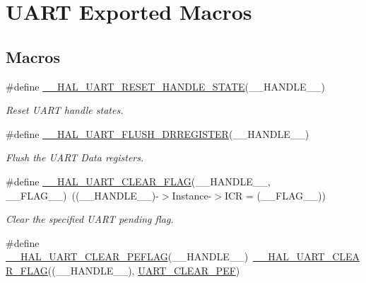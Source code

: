 \hypertarget{group___u_a_r_t___exported___macros}{}\section{U\+A\+RT Exported Macros}
\label{group___u_a_r_t___exported___macros}
\subsection*{Macros}
\begin{DoxyCompactItemize}
\item 
\#define \mbox{\hyperlink{group___u_a_r_t___exported___macros_ga19deab848407b106998416c78092fa9b}{\+\_\+\+\_\+\+H\+A\+L\+\_\+\+U\+A\+R\+T\+\_\+\+R\+E\+S\+E\+T\+\_\+\+H\+A\+N\+D\+L\+E\+\_\+\+S\+T\+A\+TE}}(\+\_\+\+\_\+\+H\+A\+N\+D\+L\+E\+\_\+\+\_\+)
\begin{DoxyCompactList}\small\item\em Reset U\+A\+RT handle states. \end{DoxyCompactList}\item 
\#define \mbox{\hyperlink{group___u_a_r_t___exported___macros_gafc4f20cb0f29ba146c9bc14167c52744}{\+\_\+\+\_\+\+H\+A\+L\+\_\+\+U\+A\+R\+T\+\_\+\+F\+L\+U\+S\+H\+\_\+\+D\+R\+R\+E\+G\+I\+S\+T\+ER}}(\+\_\+\+\_\+\+H\+A\+N\+D\+L\+E\+\_\+\+\_\+)
\begin{DoxyCompactList}\small\item\em Flush the U\+A\+RT Data registers. \end{DoxyCompactList}\item 
\#define \mbox{\hyperlink{group___u_a_r_t___exported___macros_ga9bd035161d41cde4f2568c7af06493bf}{\+\_\+\+\_\+\+H\+A\+L\+\_\+\+U\+A\+R\+T\+\_\+\+C\+L\+E\+A\+R\+\_\+\+F\+L\+AG}}(\+\_\+\+\_\+\+H\+A\+N\+D\+L\+E\+\_\+\+\_\+,  \+\_\+\+\_\+\+F\+L\+A\+G\+\_\+\+\_\+)~((\+\_\+\+\_\+\+H\+A\+N\+D\+L\+E\+\_\+\+\_\+)-\/$>$Instance-\/$>$I\+CR = (\+\_\+\+\_\+\+F\+L\+A\+G\+\_\+\+\_\+))
\begin{DoxyCompactList}\small\item\em Clear the specified U\+A\+RT pending flag. \end{DoxyCompactList}\item 
\#define \mbox{\hyperlink{group___u_a_r_t___exported___macros_gaba5e19c60e0f37341b1585a380b84d49}{\+\_\+\+\_\+\+H\+A\+L\+\_\+\+U\+A\+R\+T\+\_\+\+C\+L\+E\+A\+R\+\_\+\+P\+E\+F\+L\+AG}}(\+\_\+\+\_\+\+H\+A\+N\+D\+L\+E\+\_\+\+\_\+)~\mbox{\hyperlink{group___u_a_r_t___exported___macros_ga9bd035161d41cde4f2568c7af06493bf}{\+\_\+\+\_\+\+H\+A\+L\+\_\+\+U\+A\+R\+T\+\_\+\+C\+L\+E\+A\+R\+\_\+\+F\+L\+AG}}((\+\_\+\+\_\+\+H\+A\+N\+D\+L\+E\+\_\+\+\_\+), \mbox{\hyperlink{group___u_a_r_t___i_t___c_l_e_a_r___flags_ga9c2aef8048dd09ea5e72d69c63026f02}{U\+A\+R\+T\+\_\+\+C\+L\+E\+A\+R\+\_\+\+P\+EF}})

\end{DoxyCompactItemize}
